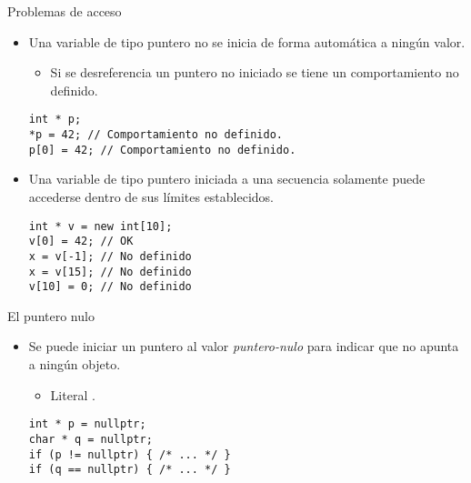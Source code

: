\begin{frame}[fragile]{Problemas de acceso}
\begin{itemize}
  \item Una variable de tipo puntero no se inicia de forma automática a ningún valor.
    \begin{itemize}
      \item Si se desreferencia un puntero no iniciado se tiene un comportamiento no definido.
    \end{itemize}
\begin{lstlisting}
int * p;
*p = 42; // Comportamiento no definido.
p[0] = 42; // Comportamiento no definido.
\end{lstlisting}

  \item Una variable de tipo puntero iniciada a una secuencia solamente puede accederse dentro
        de sus límites establecidos.
\begin{lstlisting}
int * v = new int[10];
v[0] = 42; // OK
x = v[-1]; // No definido
x = v[15]; // No definido
v[10] = 0; // No definido
\end{lstlisting}
\end{itemize}
\end{frame}

\begin{frame}[t,fragile]{El puntero nulo}
\begin{itemize}
  \item Se puede iniciar un puntero al valor \emph{puntero-nulo} para indicar que no apunta a ningún objeto.
    \begin{itemize}
      \item Literal .
    \end{itemize}
\begin{lstlisting}
int * p = nullptr;
char * q = nullptr;
if (p != nullptr) { /* ... */ }
if (q == nullptr) { /* ... */ }
\end{lstlisting}
\end{itemize}
\end{frame}

